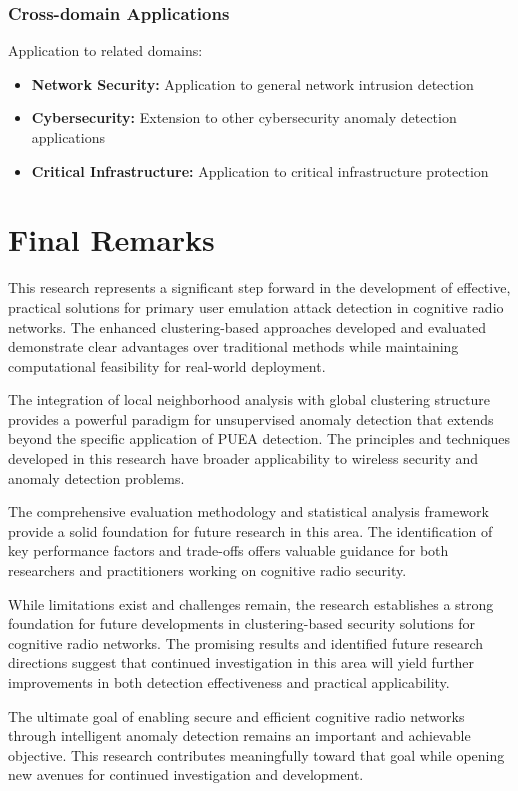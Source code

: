 \subsubsection{Cross-domain Applications}
Application to related domains:
\begin{itemize}
\item \textbf{Network Security:} Application to general network intrusion detection
\item \textbf{Cybersecurity:} Extension to other cybersecurity anomaly detection applications
\item \textbf{Critical Infrastructure:} Application to critical infrastructure protection
\end{itemize}

\section{Final Remarks}
This research represents a significant step forward in the development of effective, practical solutions for primary user emulation attack detection in cognitive radio networks. The enhanced clustering-based approaches developed and evaluated demonstrate clear advantages over traditional methods while maintaining computational feasibility for real-world deployment.

The integration of local neighborhood analysis with global clustering structure provides a powerful paradigm for unsupervised anomaly detection that extends beyond the specific application of PUEA detection. The principles and techniques developed in this research have broader applicability to wireless security and anomaly detection problems.

The comprehensive evaluation methodology and statistical analysis framework provide a solid foundation for future research in this area. The identification of key performance factors and trade-offs offers valuable guidance for both researchers and practitioners working on cognitive radio security.

While limitations exist and challenges remain, the research establishes a strong foundation for future developments in clustering-based security solutions for cognitive radio networks. The promising results and identified future research directions suggest that continued investigation in this area will yield further improvements in both detection effectiveness and practical applicability.

The ultimate goal of enabling secure and efficient cognitive radio networks through intelligent anomaly detection remains an important and achievable objective. This research contributes meaningfully toward that goal while opening new avenues for continued investigation and development.
